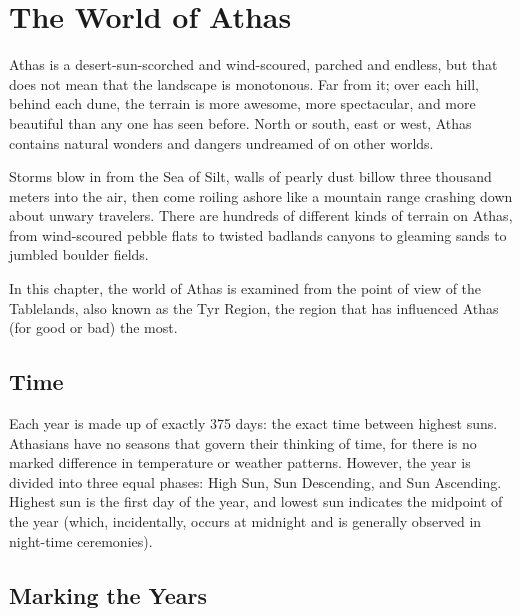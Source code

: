 \section{The World of Athas}
Athas is a desert-sun-scorched and wind-scoured, parched and endless, but that does not mean that the landscape is monotonous. Far from it; over each hill, behind each dune, the terrain is more awesome, more spectacular, and more beautiful than any one has seen before. North or south, east or west, Athas contains natural wonders and dangers undreamed of on other worlds.

Storms blow in from the Sea of Silt, walls of pearly dust billow three thousand meters into the air, then come roiling ashore like a mountain range crashing down about unwary travelers. There are hundreds of different kinds of terrain on Athas, from wind-scoured pebble flats to twisted badlands canyons to gleaming sands to jumbled boulder fields.

In this chapter, the world of Athas is examined from the point of view of the Tablelands, also known as the Tyr Region, the region that has influenced Athas (for good or bad) the most.

\subsection{Time}
Each year is made up of exactly 375 days: the exact time between highest suns. Athasians have no seasons that govern their thinking of time, for there is no marked difference in temperature or weather patterns. However, the year is divided into three equal phases: High Sun, Sun Descending, and Sun Ascending. Highest sun is the first day of the year, and lowest sun indicates the midpoint of the year (which, incidentally, occurs at midnight and is generally observed in night-time ceremonies).

\subsection{Marking the Years}


